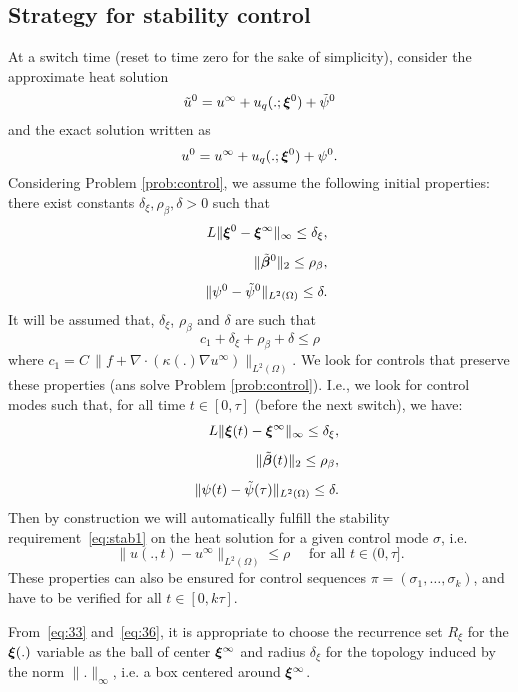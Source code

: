 %
\subsection{Strategy for stability control}
%
At a switch time (reset to time zero for the sake of simplicity), consider the approximate heat solution
\[
\tilde u^0 = u^\infty + u_q(.;\bm{\xi}^0) + \tilde \psi^0
\]
and the exact solution written as
\[
u^0 = u^\infty + u_q(.;\bm{\xi}^0) + \psi^0.
\]
Considering Problem \ref{prob:control},
we  assume the following initial properties: there exist constants
$\delta_\xi,\rho_\beta,\delta>0$ such that
%
\begin{eqnarray}
&& L \|\bm{\xi}^0-\bm{\xi}^\infty\|_\infty\leq \delta_\xi, \label{eq:33}\\[1.1ex]
&& \|\tilde {\bm{\beta}}^0\|_2 \leq \rho_\beta, \\[1.1ex]
&& \|\psi^0-\tilde\psi^0\|_{L^2(\Omega)} \leq \delta.
\end{eqnarray}
%
It will be assumed that, $\delta_\xi$, $\rho_\beta$ and $\delta$ are such that
%
\begin{equation}
c_1 + \delta_\xi + \rho_\beta + \delta \leq \rho
\end{equation}
%
where $c_1 = C\, \|f+\nabla\cdot(\kappa(.)\nabla u^\infty)\|_{L^2(\Omega)}$.
%
We look for controls that preserve these properties (ans solve Problem \ref{prob:control}).
I.e., we look for control modes such that, for all time $t \in [0, \tau]$ (before the next switch), 
we have:
%
\begin{eqnarray}
&& L \|\bm{\xi}(t)-\bm{\xi}^\infty\|_\infty\leq \delta_\xi, \label{eq:36}\\[1.1ex]
&& \|\tilde {\bm{\beta}}(t)\|_2 \leq \rho_\beta, \\[1.1ex]
&& \|\psi(t)-\tilde\psi(\tau)\|_{L^2(\Omega)} \leq \delta.
\end{eqnarray}
%
Then by construction we will automatically fulfill the stability requirement~\eqref{eq:stab1} on the heat solution for a given control mode $\sigma$, i.e.
%
\begin{equation}
\| u(.,t)-u^{\infty}\|_{L^2(\Omega)} \leq \rho \quad \mbox{ for all } t\in(0,\tau].
\label{eq:stab2}
\end{equation}
These properties can also be ensured for control sequences $\pi = (\sigma_1,\dots,\sigma_k)$, 
and have to be verified for all $t \in [0,k\tau]$. 

%
\begin{remark}
From~\eqref{eq:33} and~\eqref{eq:36}, it is appropriate to choose the recurrence
set $R_\xi$ for the $\bm{\xi}(.)$ variable as the ball of center $\bm{\xi}^\infty$ and 
radius $\delta_\xi$ for the topology induced by the norm $\|.\|_\infty$, i.e. a box centered 
around $\bm{\xi}^\infty$.
\end{remark}

